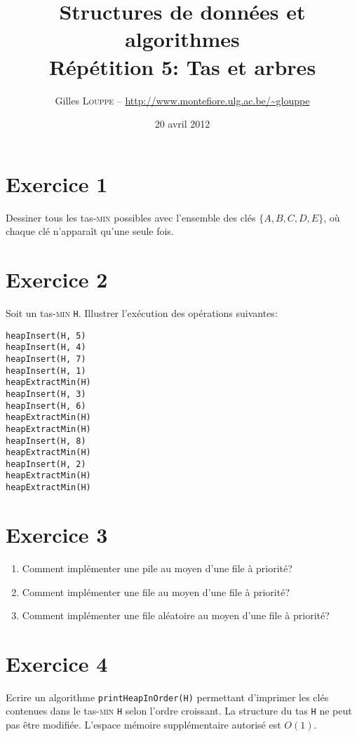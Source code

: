 \documentclass[a4paper,10pt]{article}
\title{
    \textbf{Structures de données et algorithmes}\\
    Répétition 5: Tas et arbres
}
\author{Gilles \textsc{Louppe} -- \url{http://www.montefiore.ulg.ac.be/~glouppe}}
\date{20 avril 2012}
\begin{document}
\maketitle

\section*{Exercice 1}

Dessiner tous les tas-\textsc{min} possibles avec l'ensemble des clés $\{A, B, C, D, E\}$, où chaque clé n'apparaît qu'une seule fois.

\section*{Exercice 2}

Soit un tas-\textsc{min} \texttt{H}. Illustrer l'exécution des opérations suivantes:

\begin{verbatim}
heapInsert(H, 5)
heapInsert(H, 4)
heapInsert(H, 7)
heapInsert(H, 1)
heapExtractMin(H)
heapInsert(H, 3)
heapInsert(H, 6)
heapExtractMin(H)
heapExtractMin(H)
heapInsert(H, 8)
heapExtractMin(H)
heapInsert(H, 2)
heapExtractMin(H)
heapExtractMin(H)
\end{verbatim}

\section*{Exercice 3}

\begin{enumerate}

\item Comment implémenter une pile au moyen d'une file à priorité?

\item Comment implémenter une file au moyen d'une file à priorité?

\item Comment implémenter une file aléatoire au moyen d'une file à priorité?

\end{enumerate}

\section*{Exercice 4}

Ecrire un algorithme \texttt{printHeapInOrder(H)} permettant d'imprimer les clés
contenues dans le tas-\textsc{min} \texttt{H} selon l'ordre croissant. La
structure du tas \texttt{H} ne peut pas être modifiée. L'espace mémoire supplémentaire autorisé est $O(1)$.
\end{document}
